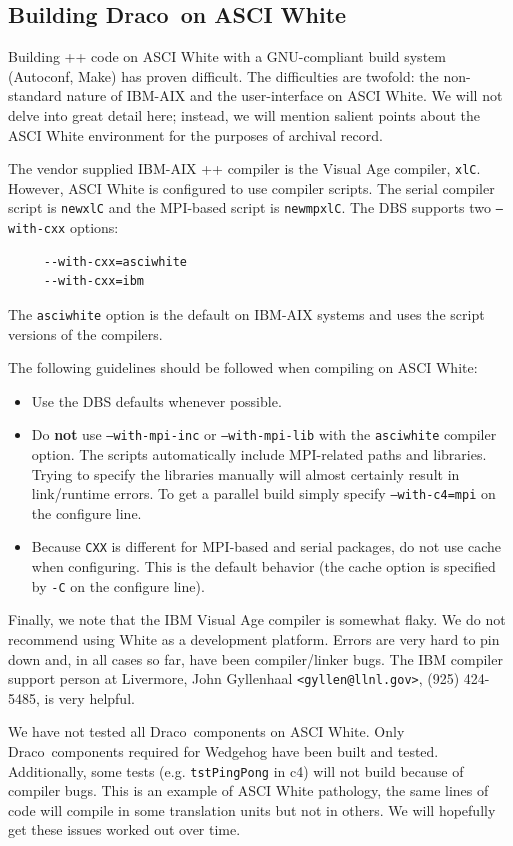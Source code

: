 \documentclass[note]{ResearchNote_pdf}
\newcommand{\draco}{Draco}
\newcommand{\autoconf}{\textsf{Autoconf}}
\newcommand{\make}{\textsf{Make}}
\begin{document}
\subsection{Building \draco\ on ASCI White}

Building \C++ code on ASCI White with a GNU-compliant build system
(\autoconf, \make) has proven difficult.  The difficulties are
twofold: the non-standard nature of IBM-AIX and the user-interface on
ASCI White.  We will not delve into great detail here; instead, we
will mention salient points about the ASCI White environment for the
purposes of archival record.

The vendor supplied IBM-AIX \C++ compiler is the Visual Age compiler, 
\texttt{xlC}.  However, ASCI White is configured to use compiler
scripts.  The serial compiler script is \texttt{newxlC} and the
MPI-based script is \texttt{newmpxlC}.  The DBS supports two
\texttt{--with-cxx} options:
\begin{verbatim}
     --with-cxx=asciwhite
     --with-cxx=ibm
\end{verbatim}
The \texttt{asciwhite} option is the default on IBM-AIX systems and
uses the script versions of the compilers. 

The following guidelines should be followed when compiling on ASCI
White:
\begin{itemize}
\item Use the DBS defaults whenever possible.
\item Do {\bf not} use \texttt{--with-mpi-inc} or
  \texttt{--with-mpi-lib} with the \texttt{asciwhite} compiler
  option.  The scripts automatically include MPI-related paths and
  libraries.  Trying to specify the libraries manually will almost
  certainly result in link/runtime errors.  To get a parallel build
  simply specify \texttt{--with-c4=mpi} on the configure line.
\item Because \texttt{CXX} is different for MPI-based and serial
  packages, do not use cache when configuring.  This is the default
  behavior (the cache option is specified by \texttt{-C} on the
  configure line).
\end{itemize}
Finally, we note that the IBM Visual Age compiler is somewhat flaky.
We do not recommend using White as a development platform.  Errors are
very hard to pin down and, in all cases so far, have been
compiler/linker bugs.  The IBM compiler support person at Livermore,
John Gyllenhaal \texttt{<gyllen@llnl.gov>}, (925) 424-5485, is very
helpful.

We have not tested all \draco\ components on ASCI White.  Only \draco\
components required for Wedgehog have been built and tested.
Additionally, some tests (e.g. \texttt{tstPingPong} in c4) will not
build because of compiler bugs.  This is an example of ASCI White
pathology, the same lines of code will compile in some translation
units but not in others.  We will hopefully get these issues worked
out over time.
\end{document}
